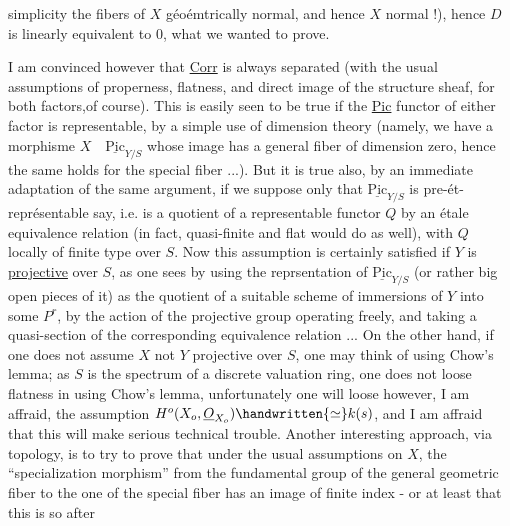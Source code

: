 simplicity the fibers of $X$ géoémtrically normal, and hence $X$ normal !), hence $D$ is linearly equivalent to $0$, what we wanted to prove.

I am convinced however that \uline{Corr} is always separated (with the usual assumptions of properness, flatness, and direct image of the structure sheaf, for both factors,of course). This is easily seen to be true if the \uline{Pic} functor of either factor is representable, by a simple use of dimension theory (namely, we have a morphisme $X\quad\underline{\mathrm{Pic}}_{Y/S}$ whose image has a general fiber of dimension zero, hence the same holds for the special fiber ...). But it is true also, by an immediate adaptation of the same argument, if we suppose only that $\underline{\mathrm{Pic}}_{Y/S}$ is pre-ét-représentable say, i.e. is a quotient of a representable functor $Q$ by an étale equivalence relation (in fact, quasi-finite and flat would do as well), with $Q$ locally of finite type over $S$. Now this assumption is certainly satisfied if $Y$ is \uline{projective} over $S$, as one sees by using the reprsentation of $\underline{\mathrm{Pic}}_{Y/S}$ (or rather big open pieces of it) as the quotient of a suitable scheme of immersions of $Y$ into some $P^{r}$, by the action of the projective group operating freely, and taking a quasi-section of the corresponding equivalence relation ... On the other hand, if one does not assume $X$ not $Y$ projective over $S$, one may think of using Chow's lemma; as $S$ is the spectrum of a discrete valuation ring, one does not loose flatness in using Chow's lemma, unfortunately one will loose however, I am affraid, the assumption $H^{o}(X_{o},\underline{O}_{X_{o}})\handwritten{\simeq}k(s)$, and I am affraid that this will make serious technical trouble. Another interesting approach, via topology, is to try to prove that under the usual assumptions on $X$, the ``specialization morphism'' from the fundamental group of the general geometric fiber to the one of the special fiber has an image of finite index - or at least that this is so after
